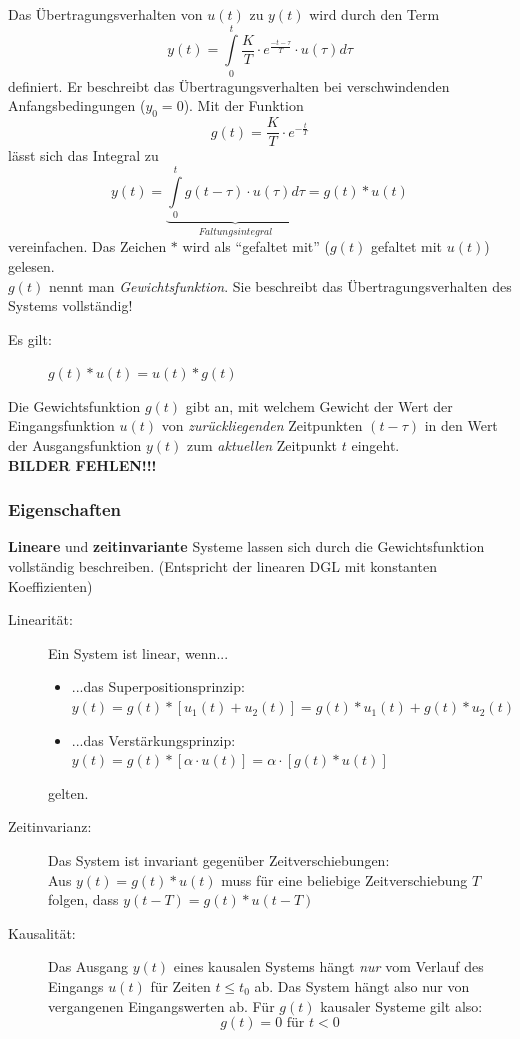 \documentclass[12pt,a4paper,ngerman]{scrartcl}
\begin{document}
Das Übertragungsverhalten von $u(t)$ zu $y(t)$ wird durch den Term
\begin{equation*}
  y(t)=\int\limits_0^t{\frac{K}{T}\cdot e^{\frac{-t-\tau}{T}}\cdot u(\tau)d\tau}
\end{equation*}
definiert. Er beschreibt das Übertragungsverhalten bei verschwindenden Anfangsbedingungen ($y_0=0$). Mit der Funktion
\begin{equation*}
  g(t)=\frac{K}{T}\cdot e^{-\frac{t}{T}}
\end{equation*}
lässt sich das Integral zu
\begin{equation*}
  y(t)=\underbrace{\int\limits_0^t{g(t-\tau)\cdot u(\tau)d\tau}}_{Faltungsintegral}=g(t)*u(t)
\end{equation*}
vereinfachen. Das Zeichen $*$ wird als ``gefaltet mit'' ($g(t)$ gefaltet mit $u(t)$) gelesen. \\
$g(t)$ nennt man \emph{Gewichtsfunktion}. Sie beschreibt das Übertragungsverhalten des Systems vollständig!

\begin{description}
\item[Es gilt:] $g(t)*u(t)=u(t)*g(t)$
\end{description}
Die Gewichtsfunktion $g(t)$ gibt an, mit welchem Gewicht der Wert der Eingangsfunktion $u(t)$ von \emph{zurückliegenden} Zeitpunkten $(t-\tau)$ in den Wert der Ausgangsfunktion $y(t)$ zum \emph{aktuellen} Zeitpunkt $t$ eingeht.\\
\textbf{BILDER FEHLEN!!!}

\subsubsection{Eigenschaften}
\textbf{Lineare} und \textbf{zeitinvariante} Systeme lassen sich durch die Gewichtsfunktion vollständig beschreiben. (Entspricht der linearen DGL mit konstanten Koeffizienten)
\begin{description}
\item[Linearität:] Ein System ist linear, wenn...
  \begin{itemize}
  \item ...das Superpositionsprinzip: $y(t)=g(t)*[u_1(t)+u_2(t)]=g(t)*u_1(t)+ g(t)*u_2(t)$
  \item ...das Verstärkungsprinzip: $y(t)=g(t)*[\alpha \cdot u(t)]= \alpha \cdot[g(t)*u(t)]$
  \end{itemize}
gelten.
\item[Zeitinvarianz:] Das System ist invariant gegenüber Zeitverschiebungen: \\
Aus $y(t)=g(t)*u(t)$ muss für eine beliebige Zeitverschiebung $T$ folgen, dass $y(t-T)=g(t)*u(t-T)$
\item[Kausalität:] Das Ausgang $y(t)$ eines kausalen Systems hängt \emph{nur} vom Verlauf des Eingangs $u(t)$ für Zeiten $t\le t_0$ ab. Das System hängt also nur von vergangenen Eingangswerten ab. Für $g(t)$ kausaler Systeme gilt also:
  \begin{equation*}
    g(t)=0 \text{ für } t<0
  \end{equation*}
\end{description}
\end{document}

